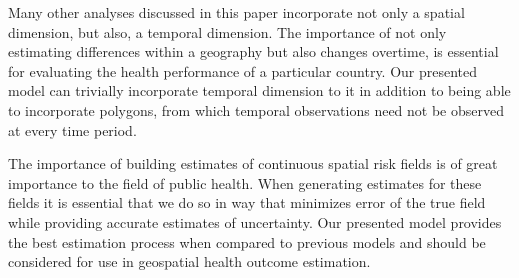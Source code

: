 \documentclass{article}
\begin{document}
Many other analyses discussed in this paper incorporate not only a spatial dimension, but also, a temporal dimension. The importance of not only estimating differences within a geography but also changes overtime, is essential for evaluating the health performance of a particular country. Our presented model can trivially incorporate temporal dimension to it in addition to being able to incorporate polygons, from which temporal observations need not be observed at every time period.

The importance of building estimates of continuous spatial risk fields is of great importance to the field of public health. When generating estimates for these fields it is essential that we do so in way that minimizes error of the true field while providing accurate estimates of uncertainty. Our presented model provides the best estimation process when compared to previous models and should be considered for use in geospatial health outcome estimation.

\newpage



\end{document}
